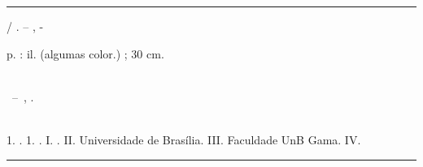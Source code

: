  \begin{fichacatalografica}
	\vspace*{\fill}					%
	\hrule							%
	\begin{center}					%
	\begin{minipage}[c]{12.5cm}		%
	
	\imprimirautor
	
	\hspace{0.5cm} \imprimirtitulo  / \imprimirautor. --
	\imprimirlocal, \imprimirdata-
	
	\hspace{0.5cm} \pageref{LastPage} p. : il. (algumas color.) ; 30 cm.\\
	
	\hspace{0.5cm} \imprimirorientadorRotulo~\imprimirorientador\\
	
	\hspace{0.5cm}
	\parbox[t]{\textwidth}{\imprimirtipotrabalho~--~\imprimirinstituicao,
	\imprimirdata.}\\
	
	\hspace{0.5cm}
		1. \imprimirpalavrachaveum.
		1. \imprimirpalavrachavedois.
		I. \imprimirorientador.
		II. Universidade de Brasília.
		III. Faculdade UnB Gama.
		IV. \imprimirtitulo\\ 			
	
	
	\end{minipage}
	\end{center}
	\hrule
	\newpage
\end{fichacatalografica}